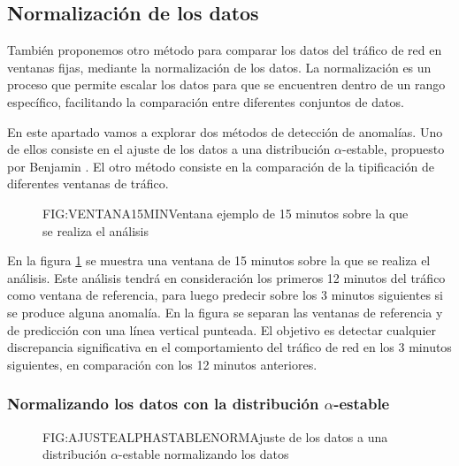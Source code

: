 \subsection{Normalización de los datos}

También proponemos otro método para comparar los datos del tráfico de red en ventanas fijas, mediante la normalización de los datos. La normalización es un proceso que permite escalar los datos para que se encuentren dentro de un rango específico, facilitando la comparación entre diferentes conjuntos de datos.

En este apartado vamos a explorar dos métodos de detección de anomalías. Uno de ellos consiste en el ajuste de los datos a una distribución $\alpha$-estable, propuesto por Benjamin \cite{benjamin2021}. El otro método consiste en la comparación de la tipificación de diferentes ventanas de tráfico.

\begin{figure}[Ventana ejemplo de 15 minutos sobre la que se realiza el análisis]{FIG:VENTANA15MIN}{Ventana ejemplo de 15 minutos sobre la que se realiza el análisis}
    \label{FIG:VENTANA15MIN}
\end{figure}

En la figura \ref{FIG:VENTANA15MIN} se muestra una ventana de 15 minutos sobre la que se realiza el análisis. Este análisis tendrá en consideración los primeros 12 minutos del tráfico como ventana de referencia, para luego predecir sobre los 3 minutos siguientes si se produce alguna anomalía. En la figura se separan las ventanas de referencia y de predicción con una línea vertical punteada. El objetivo es detectar cualquier discrepancia significativa en el comportamiento del tráfico de red en los 3 minutos siguientes, en comparación con los 12 minutos anteriores.

\subsubsection{Normalizando los datos con la distribución $\alpha$-estable}\label{SUBSEC:NORMALIZACIONALPHASTABLE}

\begin{figure}[Ajuste de los datos a una distribución $\alpha$-estable normalizando los datos]{FIG:AJUSTEALPHASTABLENORM}{Ajuste de los datos a una distribución $\alpha$-estable normalizando los datos}
    \label{FIG:AJUSTEALPHASTABLENORM}
\end{figure}

